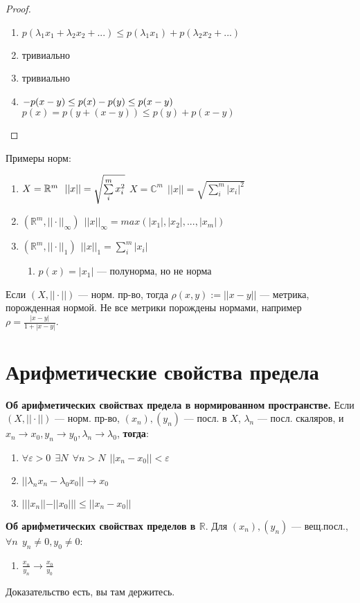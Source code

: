 \begin{proof}
\begin{enumerate}
\item $p(\lambda_1x_1+\lambda_2x_2+...)\leq p(\lambda_1x_1)+p(\lambda_2x_2+...)$
\item тривиально
\item тривиально
\item $-p(x-y)\leq p(x)-p(y)\leq p(x-y)\\$
$p(x)=p(y+(x-y))\leq p(y)+p(x-y)$
\end{enumerate}
\end{proof}

Примеры норм:
\begin{enumerate}
\item $X=\mathbb R^m \ \ ||x||=\sqrt{\sum\limits_{i}^m x_i^2} \\$
$X=\mathbb{C}^m \ \ ||x||=\sqrt{\sum\limits_{i}^m |x_i|^2}$
\item $(\mathbb R^m, ||\cdot||_\infty) \ \ ||x||_\infty=max(|x_1|,|x_2|,...,|x_m|)$
\item $(\mathbb R^m, ||\cdot||_1) \ \ ||x||_1=\sum\limits_i^m |x_i|$
\begin{enumerate}
\item $p(x)=|x_1|$ --- полунорма, но не норма
\end{enumerate}
\end{enumerate}

\begin{remark}
Если $(X, ||\cdot||)$ --- норм. пр-во, тогда $\rho(x,y):=||x-y||$ --- метрика,
порожденная нормой. Не все метрики порождены нормами, например $\rho=\frac{|x-y|}{1+|x-y|}$.
\end{remark}

\section*{Арифметические свойства предела}

\begin{theorem}
\textbf{Об арифметических свойствах предела в нормированном пространстве.}
Если $(X, ||\cdot||)$ --- норм. пр-во, $(x_n),(y_n)$ --- посл. в $X$, $\lambda_n$ ---
посл. скаляров, и $x_n\to x_0, y_n\to y_0, \lambda_n\to \lambda_0$, \textbf{тогда}:
\begin{enumerate}
\item $\forall \varepsilon>0 \ \ \exists N \ \ \forall n>N \ \ ||x_n-x_0||<\varepsilon$
\item $||\lambda_nx_n-\lambda_0x_0||\to x_0$
\item $|||x_n||-||x_0|||\leq||x_n-x_0||$
\end{enumerate}
\end{theorem}

\begin{theorem}
\textbf{Об арифметических свойствах пределов в $\mathbb{R}$}. Для $(x_n),(y_n)$ 
--- вещ.посл., $\forall n \ \ y_n\not =0, y_0\not = 0$:
\begin{enumerate}[resume]
\item $\frac{x_n}{y_n}\to\frac{x_0}{y_0}$
\end{enumerate}
\end{theorem}

Доказательство есть, вы там держитесь.

